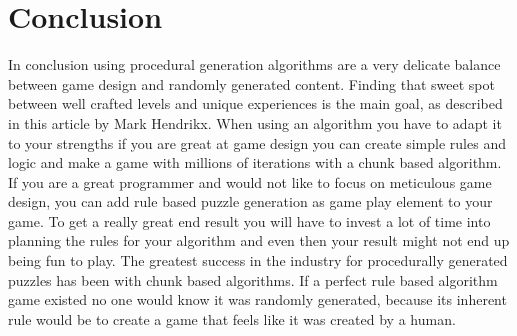 \documentclass{scrartcl}
\begin{document}
\section{Conclusion}
In conclusion using procedural generation algorithms are a very delicate balance between game design and randomly generated content. Finding that sweet spot between well crafted levels and unique experiences is the main goal, as described in this article by Mark Hendrikx\cite{hendrikx2013procedural}. When using an algorithm you have to adapt it to your strengths if you are great at game design you can create simple rules and logic and make a game with millions of iterations with a chunk based algorithm. If you are a great programmer and would not like to focus on meticulous game design, you can add rule based puzzle generation as game play element to your game. To get a really great end result you will have to invest a lot of time into planning the rules for your algorithm and even then your result might not end up being fun to play. The greatest success in the industry for procedurally generated puzzles has been with chunk based algorithms. If a perfect rule based algorithm game existed no one would know it was randomly generated, because its inherent rule would be to create a game that feels like it was created by a human.



\end{document}
